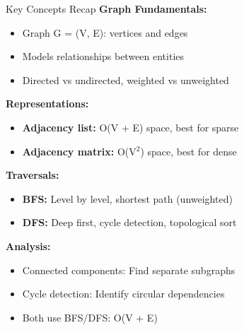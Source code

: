 \documentclass[aspectratio=169]{beamer}
\begin{document}
\begin{frame}{Key Concepts Recap}
  \textbf{Graph Fundamentals:}
  \begin{itemize}
    \item Graph G = (V, E): vertices and edges
    \item Models relationships between entities
    \item Directed vs undirected, weighted vs unweighted
  \end{itemize}

  \vspace{0.3cm}
  \textbf{Representations:}
  \begin{itemize}
    \item \textbf{Adjacency list:} O(V + E) space, best for sparse
    \item \textbf{Adjacency matrix:} O(V$^2$) space, best for dense
  \end{itemize}

  \vspace{0.3cm}
  \textbf{Traversals:}
  \begin{itemize}
    \item \textbf{BFS:} Level by level, shortest path (unweighted)
    \item \textbf{DFS:} Deep first, cycle detection, topological sort
  \end{itemize}

  \vspace{0.3cm}
  \textbf{Analysis:}
  \begin{itemize}
    \item Connected components: Find separate subgraphs
    \item Cycle detection: Identify circular dependencies
    \item Both use BFS/DFS: O(V + E)
  \end{itemize}
\end{frame}
\end{document}
